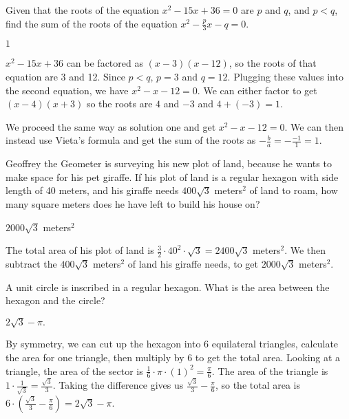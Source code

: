 \documentclass[11pt]{article}
\begin{document}
\begin{problem} %
Given that the roots of the equation $x^2 - 15x + 36 = 0$ are $p$ and $q$, and $p<q$, find the sum of the roots of the equation $x^2 - \frac{p}{3}x - q = 0$.
\end{problem}
\begin{answer}
$\boxed{1}$
\end{answer}
\begin{solutionone}
$x^2 - 15x + 36$ can be factored as $(x-3)(x-12)$, so the roots of that equation are 3 and 12. Since $p<q$, $p=3$ and $q=12$. Plugging these values into the second equation, we have $x^2 - x - 12 = 0$. We can either factor to get $(x-4)(x+3)$ so the roots are $4$ and $-3$ and $4 + (-3) = \boxed{1}$.
\end{solutionone}
\begin{solutiontwo}
We proceed the same way as solution one and get $x^2 - x - 12 = 0$. We can then instead use Vieta's formula and get the sum of the roots as $-\frac{b}{a} = -\frac{-1}{1} = \boxed{1}$.
\end{solutiontwo}

\begin{problem} %
Geoffrey the Geometer is surveying his new plot of land, because he wants to make space for his pet giraffe. If his plot of land is a regular hexagon with side length of 40 meters, and his giraffe needs $400\sqrt{3}$ meters$^2$ of land to roam, how many square meters does he have left to build his house on?
\end{problem}
\begin{answer}
$\boxed{2000\sqrt{3}}$ meters$^2$
\end{answer}
\begin{solution}
The total area of his plot of land is $\frac{3}{2}\cdot40^2\cdot\sqrt{3} = 2400\sqrt{3}$ meters$^2$. We then subtract the $400\sqrt{3}$ meters$^2$ of land his giraffe needs, to get $\boxed{2000\sqrt{3}}$ meters$^2$.
\end{solution}

\begin{problem} %
A unit circle is inscribed in a regular hexagon. What is the area between the hexagon and the circle?
\end{problem}

\begin{answer}
$\boxed{2\sqrt{3} - \pi}.$
\end{answer}

\begin{solution}
By symmetry, we can cut up the hexagon into 6 equilateral triangles, calculate the area for one triangle, then multiply by 6 to get the total area. Looking at a triangle, the area of the sector is $\frac{1}{6}\cdot\pi\cdot(1)^2 = \frac{\pi}{6}$. The area of the triangle is $1\cdot\frac{1}{\sqrt{3}} = \frac{\sqrt{3}}{3}$. Taking the difference gives us $\frac{\sqrt{3}}{3} - \frac{\pi}{6}$, so the total area is $6\cdot(\frac{\sqrt{3}}{3} - \frac{\pi}{6}) = \boxed{2\sqrt{3} - \pi}$.
\end{solution}
\end{document}
